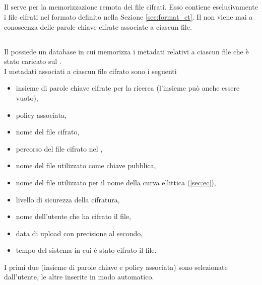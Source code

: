 \documentclass[a4paper,twoside,10pt,openany]{scrbook}
\begin{document}
\subsection{\sa}\label{sec:cloud_server}
Il \emph{\sa} serve per la memorizzazione remota dei file cifrati. Esso contiene esclusivamente i file cifrati nel formato definito nella Sezione \ref{sec:format_ct}. Il \sa non viene mai a conoscenza delle parole chiave cifrate associate a ciascun file.
%
\subsection{\sr}\label{sec:search_server}
Il \emph{\sr} possiede un database in cui memorizza i metadati relativi a ciascun file che è stato caricato sul \sa.\\
I metadati associati a ciascun file cifrato sono i seguenti
\begin{itemize}
 \item insieme di parole chiave cifrate per la ricerca (l'insieme può anche essere vuoto),
 \item policy associata,
 \item nome del file cifrato,
 \item percorso del file cifrato nel \sa,
 \item nome del file utilizzato come chiave pubblica,
 \item nome del file utilizzato per il nome della curva ellittica (\ref{sec:ec}),
 \item livello di sicurezza della cifratura,
 \item nome dell'utente che ha cifrato il file,
 \item data di upload con precisione al secondo,
 \item tempo del sistema in cui è stato cifrato il file.
\end{itemize}
I primi due (insieme di parole chiave e policy associata) sono selezionate dall'utente, le altre inserite in modo automatico.
%
%
%
%
\end{document}
